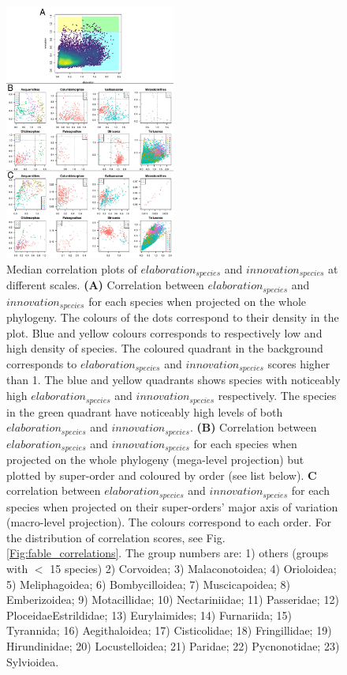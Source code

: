 \documentclass[12pt,a4paper]{article}
\begin{document}
\begin{figure}[H]
\centering
   \includegraphics[width=0.5\textwidth]{Figures/correlations.pdf}
\caption{Median correlation plots of $elaboration_{species}$ and $innovation_{species}$ at different scales. 
\textbf{(A)} Correlation between $elaboration_{species}$ and $innovation_{species}$ for each species when projected on the whole phylogeny. 
The colours of the dots correspond to their density in the plot. 
Blue and yellow colours corresponds to respectively low and high density of species. 
The coloured quadrant in the background corresponds to $elaboration_{species}$ and $innovation_{species}$ scores higher than 1. 
The blue and yellow quadrants shows species with noticeably high $elaboration_{species}$ and $innovation_{species}$ respectively. 
The species in the green quadrant have noticeably high levels of both $elaboration_{species}$ and $innovation_{species}$.
\textbf{(B)} Correlation between $elaboration_{species}$ and $innovation_{species}$ for each species when projected on the whole phylogeny (mega-level projection) but plotted by super-order and coloured by order (see list below).
\textbf{C} correlation between $elaboration_{species}$ and $innovation_{species}$ for each species when projected on their super-orders' major axis of variation (macro-level projection). 
The colours correspond to each order. 
For the distribution of correlation scores, see Fig. \ref{Fig:fable_correlations}. 
The group numbers are:
1) others (groups with $<$ 15 species)
2) Corvoidea;
3) Malaconotoidea;
4) Orioloidea;
5) Meliphagoidea;
6) Bombycilloidea;
7) Muscicapoidea;
8) Emberizoidea;
9) Motacillidae;
10) Nectariniidae;
11) Passeridae;
12) PloceidaeEstrildidae;
13) Eurylaimides;
14) Furnariida;
15) Tyrannida;
16) Aegithaloidea;
17) Cisticolidae;
18) Fringillidae;
19) Hirundinidae;
20) Locustelloidea;
21) Paridae;
22) Pycnonotidae;
23) Sylvioidea.}
\label{Fig:figure_correlations}
\end{figure}
\end{document}

